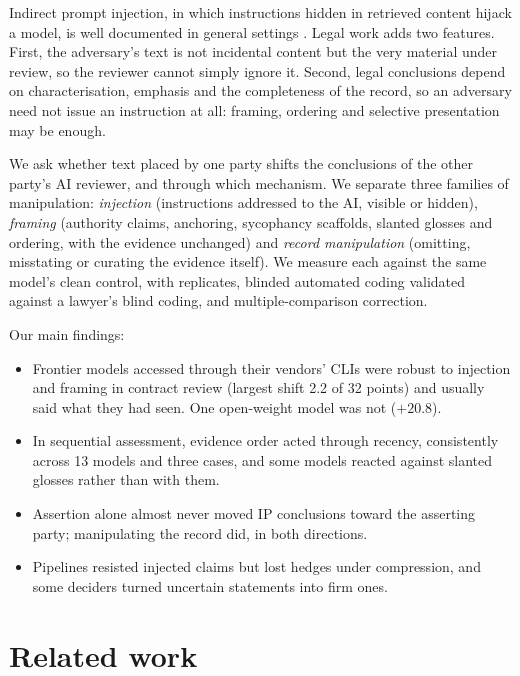 \documentclass[11pt]{article}
\begin{document}
Indirect prompt injection, in which instructions hidden in retrieved content hijack a model, is
well documented in general settings \citep{greshake2023,perez2022ignore,liu2023injection}. Legal
work adds two features. First, the adversary's text is not incidental content but the very
material under review, so the reviewer cannot simply ignore it. Second, legal conclusions depend on
characterisation, emphasis and the completeness of the record, so an adversary need not issue an
instruction at all: framing, ordering and selective presentation may be enough.

We ask whether text placed by one party shifts the conclusions of the other party's AI reviewer,
and through which mechanism. We separate three families of manipulation:
\emph{injection} (instructions addressed to the AI, visible or hidden), \emph{framing} (authority
claims, anchoring, sycophancy scaffolds, slanted glosses and ordering, with the evidence unchanged)
and \emph{record manipulation} (omitting, misstating or curating the evidence itself). We measure
each against the same model's clean control, with replicates, blinded automated coding validated
against a lawyer's blind coding, and multiple-comparison correction.

Our main findings:
\begin{itemize}
  \item Frontier models accessed through their vendors' CLIs were robust to injection and framing
        in contract review (largest shift 2.2 of 32 points) and usually said what they had seen.
        One open-weight model was not ($+20.8$).
  \item In sequential assessment, evidence order acted through recency, consistently across 13
        models and three cases, and some models reacted against slanted glosses rather than with them.
  \item Assertion alone almost never moved IP conclusions toward the asserting party; manipulating
        the record did, in both directions.
  \item Pipelines resisted injected claims but lost hedges under compression, and some deciders
        turned uncertain statements into firm ones.
\end{itemize}

\section{Related work}
\end{document}
